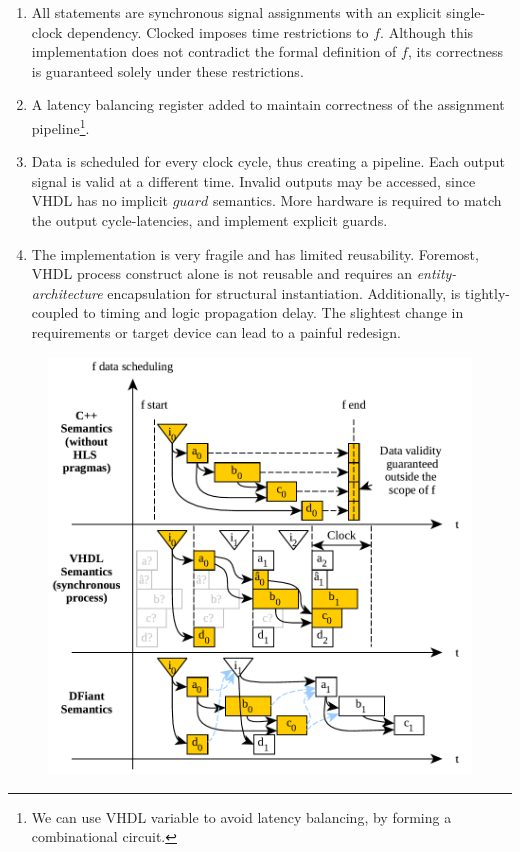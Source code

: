 \begin{enumerate}[leftmargin=*]
  \item All statements are synchronous signal assignments with an explicit single-clock dependency. Clocked  imposes time restrictions to $f$. Although this implementation does not contradict the formal definition of $f$, its correctness is guaranteed solely under these restrictions.
  \item A latency balancing register added to maintain correctness of the  assignment pipeline\footnote{We can use VHDL variable to avoid latency balancing, by forming a combinational circuit.}. 
  \item Data is scheduled for every clock cycle, thus creating a pipeline. Each output signal is valid at a different time. Invalid outputs may be accessed, since VHDL has no implicit $guard$ semantics. More hardware is required to match the output cycle-latencies, and implement explicit guards.
  \item The implementation is very fragile and has limited reusability. Foremost, VHDL process construct alone is not reusable and requires an \textit{entity-architecture} encapsulation for structural instantiation. Additionally,  is tightly-coupled to  timing and logic propagation delay. The slightest change in requirements or target device can lead to a painful redesign. 
\end{enumerate}

\begin{figure}[t]
  \vspace*{-6ex}
  \centering
  \includegraphics[width=\linewidth]{graphics/DataScheduling.pdf}
  \label{fig:DataSchedGraph}
\end{figure}

